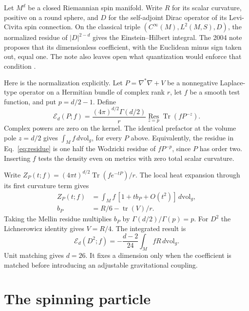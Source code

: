\documentclass[aps,prd,reprint,onecolumn,nofootinbib,amsmath,amssymb]{revtex4-2}
\newcommand{\Tr}{\operatorname{Tr}}
\newcommand{\Res}{\operatorname*{Res}}
\newcommand{\dv}{\,d\mathrm{vol}_g}
\begin{document}
Let \(M^d\) be a closed Riemannian spin manifold. Write \(R\) for its scalar
curvature, positive on a round sphere, and \(D\) for the self-adjoint Dirac
operator of its Levi-Civita spin connection. On the classical triple
\((C^\infty(M),L^2(M,S),D)\), the normalized residue of
\(\lvert D\rvert^{2-d}\) gives the Einstein--Hilbert integral. The 2004 note
proposes that its dimensionless coefficient, with the Euclidean minus sign
taken out, equal one. The note also leaves open what quantization would
enforce that condition \cite{Rivero2004Critical,KalauWalze1995}.

Here is the normalization explicitly. Let \(P=\nabla^*\nabla+V\) be a
nonnegative Laplace-type operator on a Hermitian bundle of complex rank
\(r\), let \(f\) be a smooth test function, and put \(p=d/2-1\). Define
\begin{equation}
 \mathcal E_d(P;f)=
 \frac{(4\pi)^{d/2}\Gamma(d/2)}{r}
 \Res_{z=p}\Tr(fP^{-z}).
 \label{eq:residue}
\end{equation}
Complex powers are zero on the kernel. The identical prefactor at the volume
pole \(z=d/2\) gives \(\int_M f\dv\), for every \(P\) above. Equivalently,
the residue in Eq.~\eqref{eq:residue} is one half the Wodzicki residue of
\(fP^{-p}\), since \(P\) has order two. Inserting \(f\) tests the density
even on metrics with zero total scalar curvature.

Write \(Z_P(t;f)=(4\pi t)^{d/2}\Tr(f e^{-tP})/r\). The local heat
expansion through its first curvature term gives \cite{McKeanSinger1967,KalauWalze1995}
\begin{equation}
 \begin{aligned}
 Z_P(t;f)&=\int_M f\,[1+t b_P+O(t^2)]\dv ,\\
 b_P&=R/6-\operatorname{tr}(V)/r .
 \end{aligned}
 \label{eq:heat}
\end{equation}
Taking the Mellin residue multiplies \(b_P\)
by \(\Gamma(d/2)/\Gamma(p)=p\). For \(D^2\) the Lichnerowicz identity gives
\(V=R/4\). The integrated result is
\begin{equation}
 \mathcal E_d(D^2;f)=-\frac{d-2}{24}\int_M fR\dv .
 \label{eq:original}
\end{equation}
Unit matching gives \(d=26\). It fixes a dimension only when the coefficient
is matched before introducing an adjustable gravitational coupling.

\section{The spinning particle}
\end{document}
